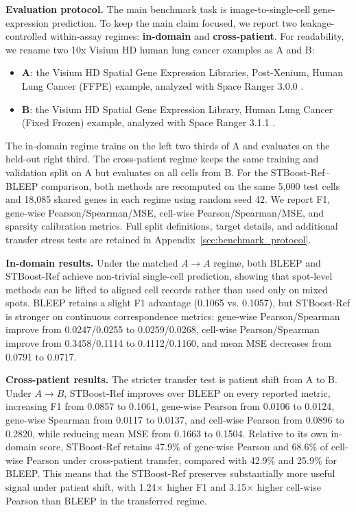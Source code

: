 \documentclass{article}
\begin{document}
\noindent\textbf{Evaluation protocol.}
The main benchmark task is image-to-single-cell gene-expression prediction. To keep the main claim focused, we report two leakage-controlled within-assay regimes: \textbf{in-domain} and \textbf{cross-patient}. For readability, we rename two 10x Visium HD human lung cancer examples as A and B:
\begin{itemize}[leftmargin=1.4em,itemsep=0pt,topsep=2pt,parsep=0pt]
    \item \textbf{A}: the Visium HD Spatial Gene Expression Libraries, Post-Xenium, Human Lung Cancer (FFPE) example, analyzed with Space Ranger 3.0.0 \cite{tenx_visium_hd_postx_lung_ffpe}.
    \item \textbf{B}: the Visium HD Spatial Gene Expression Library, Human Lung Cancer (Fixed Frozen) example, analyzed with Space Ranger 3.1.1 \cite{tenx_visium_hd_lung_fixed_frozen}.
\end{itemize}
The in-domain regime trains on the left two thirds of A and evaluates on the held-out right third. The cross-patient regime keeps the same training and validation split on A but evaluates on all cells from B. For the STBoost-Ref--BLEEP comparison, both methods are recomputed on the same 5{,}000 test cells and 18{,}085 shared genes in each regime using random seed 42. We report F1, gene-wise Pearson/Spearman/MSE, cell-wise Pearson/Spearman/MSE, and sparsity calibration metrics. Full split definitions, target details, and additional transfer stress tests are retained in Appendix~\ref{sec:benchmark_protocol}.


\noindent\textbf{In-domain results.}
Under the matched $A\!\to\!A$ regime, both BLEEP and STBoost-Ref achieve non-trivial single-cell prediction, showing that spot-level methods can be lifted to aligned cell records rather than used only on mixed spots. BLEEP retains a slight F1 advantage (0.1065 vs. 0.1057), but STBoost-Ref is stronger on continuous correspondence metrics: gene-wise Pearson/Spearman improve from 0.0247/0.0255 to 0.0259/0.0268, cell-wise Pearson/Spearman improve from 0.3458/0.1114 to 0.4112/0.1160, and mean MSE decreases from 0.0791 to 0.0717.

\noindent\textbf{Cross-patient results.}
The stricter transfer test is patient shift from A to B. Under $A\!\to\!B$, STBoost-Ref improves over BLEEP on every reported metric, increasing F1 from 0.0857 to 0.1061, gene-wise Pearson from 0.0106 to 0.0124, gene-wise Spearman from 0.0117 to 0.0137, and cell-wise Pearson from 0.0896 to 0.2820, while reducing mean MSE from 0.1663 to 0.1504. Relative to its own in-domain score, STBoost-Ref retains 47.9\% of gene-wise Pearson and 68.6\% of cell-wise Pearson under cross-patient transfer, compared with 42.9\% and 25.9\% for BLEEP. This means that the STBoost-Ref preserves substantially more useful signal under patient shift, with 1.24$\times$ higher F1 and 3.15$\times$ higher cell-wise Pearson than BLEEP in the transferred regime.
\end{document}
